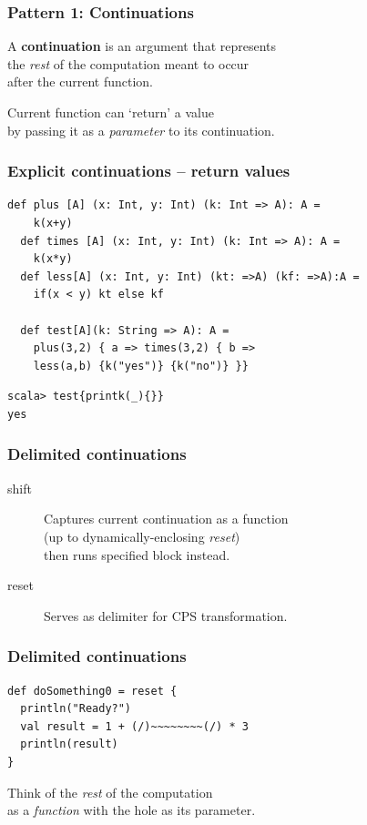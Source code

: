 \documentclass[14pt,t,usepdftitle=false,
xcolornames=x11names,svgnames,dvipsnames]{beamer}
\begin{document}
\begin{frame}
  \frametitle{Pattern 1: Continuations}
  A \textbf{continuation} is an argument that represents\\ the
  \emph{rest} of the computation meant to occur\\after the current
  function.
  \bigskip

  Current function can `return' a value\\by passing it as a
  \textit{parameter} to its continuation.
\end{frame}

\begin{frame}[fragile]
  \frametitle{Explicit continuations -- return values}
\begin{lstlisting}[style=scala,moreemph={A}]
  def plus [A] (x: Int, y: Int) (k: Int => A): A =
    k(x+y)
  def times [A] (x: Int, y: Int) (k: Int => A): A =
    k(x*y)
  def less[A] (x: Int, y: Int) (kt: =>A) (kf: =>A):A =
    if(x < y) kt else kf

  def test[A](k: String => A): A =
    plus(3,2) { a => times(3,2) { b =>
    less(a,b) {k("yes")} {k("no")} }}
\end{lstlisting}
\begin{lstlisting}[style=scalarepl]
scala> test{printk(_){}}
yes
\end{lstlisting}
\end{frame}

\begin{frame}
  \frametitle{Delimited continuations}
  \begin{description}
  \item[shift] Captures current continuation as a function\\
    (up to dynamically-enclosing \emph{reset})\\
    then runs specified block instead.
  \item[reset] Serves as delimiter for CPS transformation.
  \end{description}
\end{frame}

\begin{frame}[fragile]
  \frametitle{Delimited continuations}
\begin{lstlisting}[style=scala,emph={[2]reset}]
def doSomething0 = reset {
  println("Ready?")
  val result = 1 + (/)~~~~~~~~(/) * 3
  println(result)
}
\end{lstlisting}

  Think of the \emph{rest} of the computation\\as a \emph{function}
  with the hole as its parameter.
\end{frame}
\end{document}
